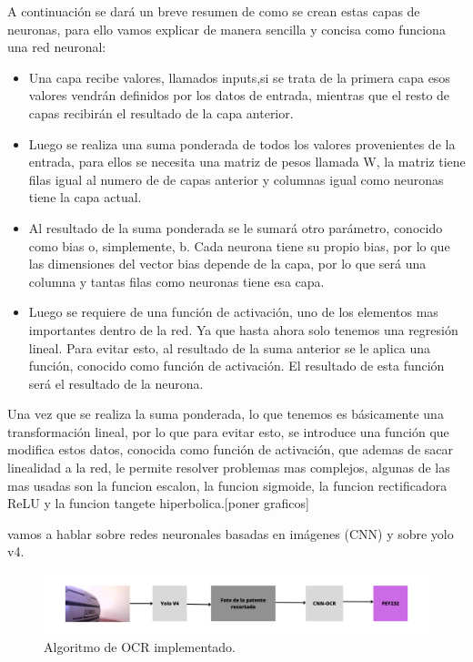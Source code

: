 A continuación se dará un breve resumen de como se crean estas capas de neuronas, para ello vamos explicar de manera sencilla y concisa como funciona una red neuronal:
\begin{itemize}
    \item Una capa recibe valores, llamados inputs,si se trata de la primera capa esos valores vendrán definidos por los datos de entrada, mientras que el resto de capas recibirán el resultado de la capa anterior.
    \item Luego se realiza una suma ponderada de todos los valores provenientes de la entrada, para ellos se necesita una matriz de pesos llamada W, la matriz tiene filas igual al numero de de capas anterior y columnas igual como neuronas tiene la capa actual.
    \item Al resultado de la suma ponderada se le sumará otro parámetro, conocido como bias o, simplemente, b. Cada neurona tiene su propio bias, por lo que las dimensiones del vector bias depende de la capa, por lo que será una columna y tantas filas como neuronas tiene esa capa.
    \item Luego se requiere de una función de activación, uno de los elementos mas importantes dentro de la red. Ya que hasta ahora solo tenemos una regresión lineal. Para evitar esto, al resultado de la suma anterior se le aplica una función, conocido como función de activación. El resultado de esta función será el resultado de la neurona.
\end{itemize}

Una vez que se realiza la suma ponderada, lo que tenemos es básicamente una transformación lineal, por lo que para evitar esto, se introduce una función que modifica estos datos, conocida como función de activación, que ademas de sacar linealidad a la red, le permite resolver problemas mas complejos, algunas de las mas usadas son la funcion escalon, la funcion sigmoide, la funcion rectificadora ReLU y la funcion tangete hiperbolica.[poner graficos]


vamos a hablar sobre redes neuronales basadas en imágenes (CNN) y sobre yolo v4.

\begin{figure}[bth]
    \centering
    \includegraphics[width=\textwidth]{imgs/algoritmo-deteccion-patente.png}
    \caption{Algoritmo de OCR implementado.}
\end{figure}



